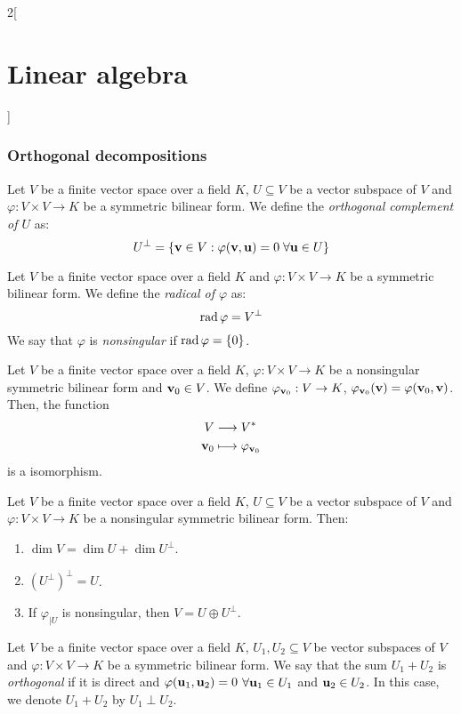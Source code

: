 \documentclass[../../../main.tex]{subfiles}
\begin{document}
\begin{multicols}{2}[\section{Linear algebra}]
  \subsubsection*{Orthogonal decompositions}
  \begin{definition}\label{ALG-singular}
    Let $V$ be a finite vector space over a field $K$, $U\subseteq V$ be a vector subspace of $V$ and $\varphi:V\times V\rightarrow K$ be a symmetric bilinear form. We define the \textit{orthogonal complement of $U$} as: $$U^\perp=\{\vb{v}\in V:\varphi(\vb{v},\vb{u})=0\;\forall\vb{u}\in U\}$$
  \end{definition}
  \begin{definition}
    Let $V$ be a finite vector space over a field $K$ and $\varphi:V\times V\rightarrow K$ be a symmetric bilinear form. We define the \textit{radical of $\varphi$} as: $$\operatorname{rad}\varphi=V^\perp$$ We say that $\varphi$ is \textit{nonsingular} if $\operatorname{rad}\varphi=\{0\}$.
  \end{definition}
  \begin{definition}
    Let $V$ be a finite vector space over a field $K$, $\varphi:V\times V\rightarrow K$ be a nonsingular symmetric bilinear form and $\vb{v}_0\in V$. We define $\varphi_{\vb{v}_0}:V\rightarrow K$, $\varphi_{\vb{v}_0}(\vb{v})=\varphi(\vb{v}_0,\vb{v})$. Then, the function
    \begin{align*}
      V               & \longrightarrow V^*                  \\
      \vb{v}_0 & \longmapsto\varphi_{\vb{v}_0}
    \end{align*} is a isomorphism.
  \end{definition}
  \begin{definition}
    Let $V$ be a finite vector space over a field $K$, $U\subseteq V$ be a vector subspace of $V$ and $\varphi:V\times V\rightarrow K$ be a nonsingular symmetric bilinear form. Then:
    \begin{enumerate}
      \item $\dim V=\dim U+\dim U^\perp$.
      \item ${(U^\perp)}^\perp=U$.
      \item If $\varphi_{|U}$ is nonsingular, then $V=U\oplus U^\perp$.
    \end{enumerate}
  \end{definition}
  \begin{definition}
    Let $V$ be a finite vector space over a field $K$, $U_1,U_2\subseteq V$ be vector subspaces of $V$ and $\varphi:V\times V\rightarrow K$ be a symmetric bilinear form. We say that the sum $U_1+U_2$ is \textit{orthogonal} if it is direct and $\varphi(\vb{u}_1,\vb{u}_2)=0$ $\forall \vb{u}_1\in U_1$ and $\vb{u}_2\in U_2$. In this case, we denote $U_1+U_2$ by $U_1\perp U_2$.

\end{definition}
\end{multicols}
\end{document}
